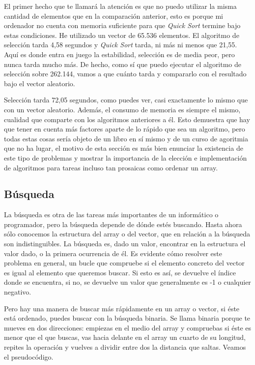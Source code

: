 \documentclass[a4paper]{article}
\begin{document}
El primer hecho que te llamará la atención es que no puedo utilizar la misma
cantidad de elementos que en la comparación anterior, esto es porque mi
ordenador no cuenta con memoria suficiente para que \textit{Quick Sort} termine
bajo estas condiciones. He utilizado un vector de 65.536 elementos. El
algoritmo de selección tarda 4,58 segundos y \textit{Quick Sort} tarda, ni más
ni menos que 21,55. Aquí es donde entra en juego la estabilidad, selección
es de media peor, pero nunca tarda mucho más. De hecho, como sí que puedo
ejecutar el algoritmo de selección sobre 262.144, vamos a que cuánto tarda y
compararlo con el resultado bajo el vector aleatorio.

Selección tarda 72,05 segundos, como puedes ver, casi exactamente lo mismo
que con un vector aleatorio. Además, el consumo de memoria es siempre el mismo,
cualidad que comparte con los algoritmos anteriores a él.
Esto demuestra que hay que tener
en cuenta más factores aparte de lo rápido que sea un algoritmo, pero todas
estas cosas sería objeto de un libro en sí mismo y de un curso de agoritmia que
no ha lugar, el motivo de esta sección es más bien enunciar la existencia de
este tipo de problemas y mostrar la importancia de la elección e implementación
de algoritmos para tareas incluso tan prosaicas como ordenar un array.

\subsection{Búsqueda}
La búsqueda es otra de las tareas más importantes de un informático o
programador, pero la búsqueda depende de dónde estés buscando. Hasta ahora sólo
conocemos la estructura del array o del vector, que en relación a la búsqueda
son indistinguibles. La búsqueda es, dado un valor, encontrar en la estructura
el valor dado, o la primera ocurrencia de él. Es evidente cómo resolver este
problema en general, un bucle que compruebe si el elemento concreto del vector
es igual al elemento que queremos buscar. Si esto es así, se devuelve el
índice donde se encuentra, si no, se devuelve un valor que generalmente es -1
o cualquier negativo.

Pero hay una manera de buscar más rápidamente en un array o vector, si éste está
ordenado, puedes buscar con la búsqueda binaria. Se llama binaria porque te
mueves en dos direcciones: empiezas en el medio del array y compruebas si éste
es menor que el que buscas, vas hacia delante en el array un cuarto de su
longitud, repites la operación y vuelves a dividir entre dos la distancia que
saltas. Veamos el pseudocódigo.
\end{document}
